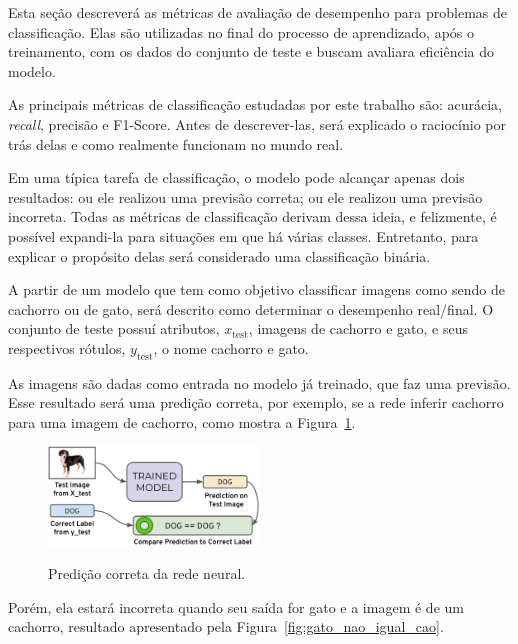             Esta seção descreverá as métricas de avaliação de desempenho para problemas de classificação. Elas são utilizadas no final do processo de aprendizado, após o treinamento, com os dados do conjunto de teste e buscam avaliara eficiência do modelo. 
            
            As principais métricas de classificação estudadas por este trabalho são: acurácia, \textit{recall}, precisão e F1-Score. Antes de descrever-las, será explicado o raciocínio por trás delas e como realmente funcionam no mundo real. 
            
            Em uma típica tarefa de classificação, o modelo pode alcançar apenas dois resultados: ou ele realizou uma previsão correta; ou ele realizou uma previsão incorreta. Todas as métricas de classificação derivam dessa ideia, e felizmente, é possível expandi-la para situações em que há várias classes. Entretanto, para explicar o propósito delas será considerado uma classificação binária.
            
            A partir de um modelo que tem como objetivo classificar imagens como sendo de cachorro ou de gato, será descrito como determinar o desempenho real/final. O conjunto de teste possuí atributos, $x_{\text{test}}$, imagens de cachorro e gato, e seus respectivos rótulos, $y_{\text{test}}$, o nome cachorro e gato. 
            
            As imagens são dadas como entrada no modelo já treinado, que faz uma previsão. Esse resultado será uma predição correta, por exemplo, se a rede inferir cachorro para uma imagem de cachorro, como mostra a Figura~\ref{fig:cao_igual_cao}. 
            
            \begin{figure}[H]
                \centering
                \caption{Predição correta da rede neural.}
                \includegraphics[width=0.5\textwidth]{fig/2-fundamentacao/metricas/cao_igual-cao.png}
                \label{fig:cao_igual_cao}
            \end{figure}
            
            Porém, ela estará incorreta quando seu saída for gato e a imagem é de um cachorro, resultado apresentado pela Figura~\ref{fig:gato_nao_igual_cao}. 
        
